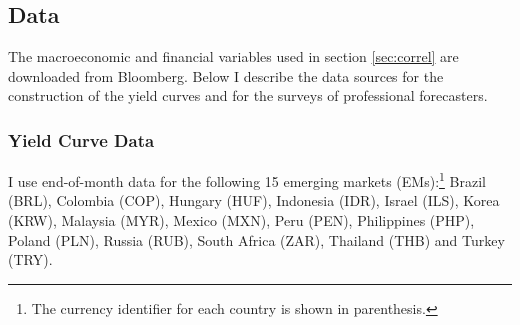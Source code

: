 %

\subsection{Data}
The macroeconomic and financial variables used in section \ref{sec:correl} are downloaded from Bloomberg. Below I describe the data sources for the construction of the yield curves and for the surveys of professional forecasters.

\subsubsection{Yield Curve Data}
I use end-of-month data for the following 15 emerging markets (EMs):\footnote{The currency identifier for each country is shown in parenthesis.} Brazil (BRL), Colombia (COP), Hungary (HUF), Indonesia (IDR), Israel (ILS), Korea (KRW), Malaysia (MYR), Mexico (MXN), Peru (PEN), Philippines (PHP), Poland (PLN), Russia (RUB), South Africa (ZAR), Thailand (THB) and Turkey (TRY). 

